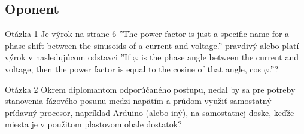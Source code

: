 \documentclass[hyperref={unicode}]{beamer}
\begin{document}
\subsection{Oponent}
\label{sub:Oponent}

\begin{frame}
	\begin{block}{Otázka 1}
		Je výrok na strane 6 ''The power factor is just a specific name for a phase shift between the sinusoids of a current and voltage.'' pravdivý alebo platí výrok v nasledujúcom odstavci ''If $\varphi$ is the phase angle between the current and voltage, then the power factor is equal to the cosine of that angle, cos $\varphi$.''?
	\end{block}

	\begin{block}{Otázka 2}
		Okrem diplomantom odporúčaného postupu, nedal by sa pre potreby stanovenia fázového posunu medzi napätím a prúdom využiť samostatný prídavný procesor, napríklad Arduino (alebo iný), na samostatnej doske, keďže miesta je v použitom plastovom obale dostatok?
	\end{block}
\end{frame}
\end{document}
